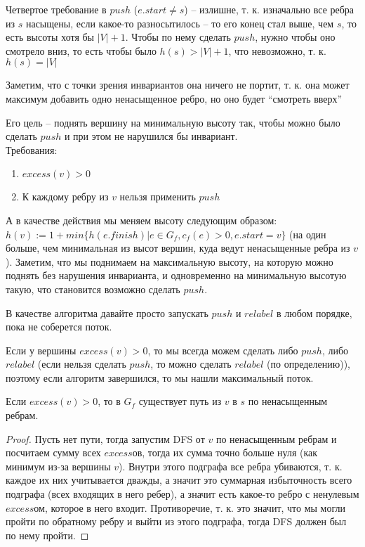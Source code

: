 \begin{note}
    Четвертое требование в $push$ ($e.start \neq s$) -- излишне, т. к. изначально все ребра из $s$ насыщены, если какое-то разносытилось -- то его конец стал выше, чем $s$, то есть высоты хотя бы $|V|+1$. Чтобы по нему сделать $push$, нужно чтобы оно смотрело вниз, то есть чтобы было $h(s) > |V| + 1$, что невозможно, т. к. $h(s) = |V|$
\end{note}

\noindent Заметим, что с точки зрения инвариантов она ничего не портит, т. к. она может максимум добавить одно ненасыщенное ребро, но оно будет ``смотреть вверх''

\begin{definition}
    Его цель -- поднять вершину на минимальную высоту так, чтобы можно было сделать $push$ и при этом не нарушился бы инвариант. \\
    Требования:
    \begin{enumerate}
        \item $excess(v) > 0$
        \item К каждому ребру из $v$ нельзя применить $push$
    \end{enumerate}
    А в качестве действия мы меняем высоту следующим образом: $h(v) := 1 + min\{h(e.finish) | e \in G_f, c_f(e) > 0, e.start = v\}$ (на один больше, чем минимальная из высот вершин, куда ведут ненасыщенные ребра из $v$). Заметим, что мы поднимаем на максимальную высоту, на которую можно поднять без нарушения инварианта, и одновременно на минимальную высотую такую, что становится возможно сделать $push$.
\end{definition}

\noindent В качестве алгоритма давайте просто запускать $push$ и $relabel$ в любом порядке, пока не соберется поток.

\begin{note}
    Если у вершины $excess(v) > 0$, то мы всегда можем сделать либо $push$, либо $relabel$ (если нельзя сделать $push$, то можно сделать $relabel$ (по определению)), поэтому если алгоритм завершился, то мы нашли максимальный поток.
\end{note}

\begin{lemma}
    Если $excess(v) > 0$, то в $G_f$ существует путь из $v$ в $s$ по ненасыщенным ребрам.
\end{lemma}

\begin{proof}
    Пусть нет пути, тогда запустим DFS от $v$ по ненасыщенным ребрам и посчитаем сумму всех $excess$ов, тогда их сумма точно больше нуля (как минимум из-за вершины $v$). Внутри этого подграфа все ребра убиваются, т. к. каждое их них учитывается дважды, а значит это суммарная избыточность всего подграфа (всех входящих в него ребер), а значит есть какое-то ребро с ненулевым $excess$ом, которое в него входит. Противоречие, т. к. это значит, что мы могли пройти по обратному ребру и выйти из этого подграфа, тогда DFS должен был по нему пройти.
\end{proof}

